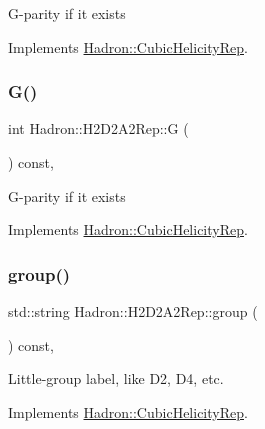 G-\/parity if it exists 

Implements \mbox{\hyperlink{structHadron_1_1CubicHelicityRep_a50689f42be1e6170aa8cf6ad0597018b}{Hadron\+::\+Cubic\+Helicity\+Rep}}.

\mbox{\label{structHadron_1_1H2D2A2Rep_ac1b2b45b37d739d8310f21abba40eb84}} 
\subsubsection{\texorpdfstring{G()}{G()}\hspace{0.1cm}{\footnotesize\ttfamily [2/2]}}
{\footnotesize\ttfamily int Hadron\+::\+H2\+D2\+A2\+Rep\+::G (\begin{DoxyParamCaption}{ }\end{DoxyParamCaption}) const\hspace{0.3cm}{\ttfamily [inline]}, {\ttfamily [virtual]}}

G-\/parity if it exists 

Implements \mbox{\hyperlink{structHadron_1_1CubicHelicityRep_a50689f42be1e6170aa8cf6ad0597018b}{Hadron\+::\+Cubic\+Helicity\+Rep}}.

\mbox{\label{structHadron_1_1H2D2A2Rep_a03d366c9b575134ad5bfdba3884b4181}} 
\subsubsection{\texorpdfstring{group()}{group()}\hspace{0.1cm}{\footnotesize\ttfamily [1/3]}}
{\footnotesize\ttfamily std\+::string Hadron\+::\+H2\+D2\+A2\+Rep\+::group (\begin{DoxyParamCaption}{ }\end{DoxyParamCaption}) const\hspace{0.3cm}{\ttfamily [inline]}, {\ttfamily [virtual]}}

Little-\/group label, like D2, D4, etc. 

Implements \mbox{\hyperlink{structHadron_1_1CubicHelicityRep_a101a7d76cd8ccdad0f272db44b766113}{Hadron\+::\+Cubic\+Helicity\+Rep}}.

\mbox{\label{structHadron_1_1H2D2A2Rep_a03d366c9b575134ad5bfdba3884b4181}} 

